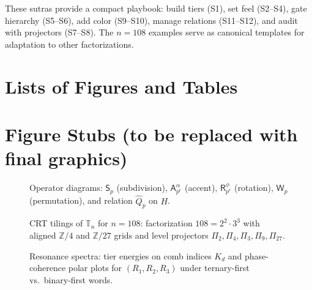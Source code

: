 \documentclass[12pt]{article}
\numberwithin{equation}{section}
\theoremstyle{plain}
\theoremstyle{definition}
\theoremstyle{remark}
\newcommand{\Z}{\mathbb{Z}}
\newcommand{\Tn}{\mathbb{T}_n}
\newcommand{\Sp}[1]{\mathsf{S}_{#1}}              %
\newcommand{\A}[2]{\mathsf{A}_{#1}^{#2}}           %
\newcommand{\Rop}[2]{\mathsf{R}_{#1}^{#2}}         %
\newcommand{\Wop}[1]{\mathsf{W}_{#1}}              %
\newcommand{\Qhat}[1]{\hat{Q}_{#1}}                %
\newcommand{\Pid}[1]{\Pi_{#1}}                     %
\begin{document}
\noindent
These sutras provide a compact playbook: build tiers (S1), set feel (S2–S4), gate hierarchy (S5–S6), add color (S9–S10), manage relations (S11–S12), and audit with projectors (S7–S8). The $n{=}108$ examples serve as canonical templates for adaptation to other factorizations.

\clearpage
\section*{Lists of Figures and Tables}

\listoffigures
\bigskip
\listoftables

\clearpage
\section*{Figure Stubs (to be replaced with final graphics)}
\begin{figure}[h]
  \centering
  \fbox{\rule{0pt}{2in}\rule{0.95\linewidth}{0pt}}
  \caption{Operator diagrams: $\Sp{p}$ (subdivision), $\A{p^r}{\alpha}$ (accent),
           $\Rop{p^r}{\phi}$ (rotation), $\Wop{p}$ (permutation), and relation $\Qhat{p}$ on $H$.}
  \label{fig:operators}
\end{figure}

\begin{figure}[h]
  \centering
  \fbox{\rule{0pt}{2in}\rule{0.95\linewidth}{0pt}}
  \caption{CRT tilings of $\Tn$ for $n=108$: factorization $108=2^2\cdot3^3$ with aligned
           $\Z/4$ and $\Z/27$ grids and level projectors $\Pid{2},\Pid{4},\Pid{3},\Pid{9},\Pid{27}$.}
  \label{fig:crt-tilings}
\end{figure}

\begin{figure}[h]
  \centering
  \fbox{\rule{0pt}{2in}\rule{0.95\linewidth}{0pt}}
  \caption{Resonance spectra: tier energies on comb indices $K_d$ and phase-coherence polar plots
           for $(R_1,R_2,R_3)$ under ternary-first vs.\ binary-first words.}
  \label{fig:resonance-spectra}
\end{figure}
\end{document}
